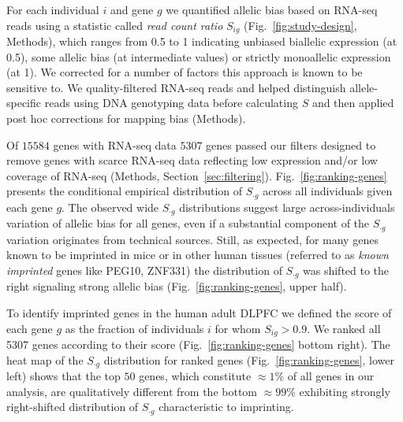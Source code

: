\documentclass[letterpaper]{article}
\begin{document}
For each individual \(i\) and gene \(g\) we quantified allelic bias based on
RNA-seq reads using a statistic called \emph{read count ratio} \(S_{ig}\)
(Fig.~\ref{fig:study-design}, Methods), which ranges from 0.5 to 1 indicating unbiased
biallelic expression (at 0.5), some allelic bias (at intermediate values) or
strictly monoallelic expression (at 1).  We corrected for a number
of factors this approach is known to be sensitive to.  We quality-filtered
RNA-seq reads and helped distinguish allele-specific reads using DNA
genotyping data before calculating \(S\) and then applied post hoc corrections
for mapping bias (Methods).

Of \(15584\) genes with RNA-seq data \(5307\) genes passed our filters designed to remove genes with
scarce RNA-seq data reflecting low expression and/or low coverage of
RNA-seq (Methods, Section~\ref{sec:filtering}).
Fig.~\ref{fig:ranking-genes} presents the conditional empirical distribution
of \(S_{\cdot g}\) across all individuals given each gene \(g\).  The observed wide
\(S_{\cdot g}\) distributions suggest large across-individuals variation of allelic bias for all
genes, even if a substantial component of the \(S_{\cdot g}\) variation originates from technical sources.
Still, as expected, for many genes known to be imprinted in mice or in other human tissues
(referred to as \emph{known imprinted} genes like PEG10, ZNF331) the distribution of \(S_{\cdot g}\) was shifted
to the right signaling strong allelic bias (Fig.~\ref{fig:ranking-genes}, upper
half).

To identify imprinted genes in the human adult DLPFC we defined the score of
each gene \(g\) as the fraction of individuals \(i\) for whom \(S_{ig}>0.9\).
We ranked all 5307 genes according to their score
(Fig.~\ref{fig:ranking-genes} bottom right).  The heat map of the \(S_{\cdot
g}\) distribution for ranked genes (Fig.~\ref{fig:ranking-genes}, lower left)
shows that the top \(50\) genes, which constitute \(\approx 1\%\) of all genes
in our analysis, are qualitatively different from the bottom \(\approx 99\%\)
exhibiting strongly right-shifted distribution of \(S_{\cdot g}\)
characteristic to imprinting.
\end{document}
